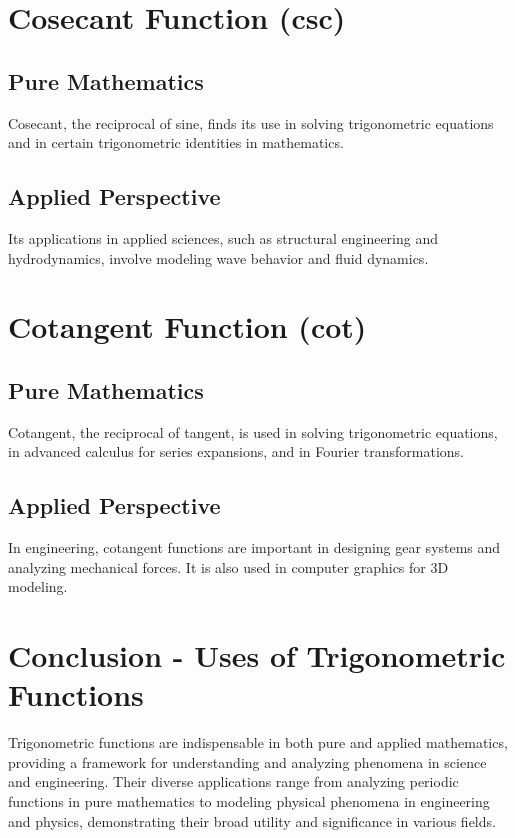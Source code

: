 \documentclass[a4paper,12pt]{book}
\begin{document}
\section*{Cosecant Function (csc)}
\subsection*{Pure Mathematics}
Cosecant, the reciprocal of sine, finds its use in solving trigonometric equations and in certain trigonometric identities in mathematics.

\subsection*{Applied Perspective}
Its applications in applied sciences, such as structural engineering and hydrodynamics, involve modeling wave behavior and fluid dynamics.

\section*{Cotangent Function (cot)}
\subsection*{Pure Mathematics}
Cotangent, the reciprocal of tangent, is used in solving trigonometric equations, in advanced calculus for series expansions, and in Fourier transformations.

\subsection*{Applied Perspective}
In engineering, cotangent functions are important in designing gear systems and analyzing mechanical forces. It is also used in computer graphics for 3D modeling.

\section*{Conclusion - Uses of Trigonometric Functions}
Trigonometric functions are indispensable in both pure and applied mathematics, providing a framework for understanding and analyzing phenomena in science and engineering. Their diverse applications range from analyzing periodic functions in pure mathematics to modeling physical phenomena in engineering and physics, demonstrating their broad utility and significance in various fields.


\end{document}
